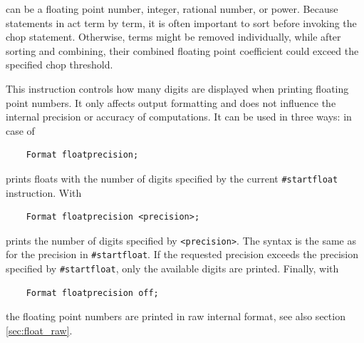 \begin{description}
can be a floating point number, integer, rational number, or power. Because 
statements in \FORM{} act term by term, it is often important to sort before invoking the 
chop statement. Otherwise, terms might be removed individually, while after 
sorting and combining, their combined floating point coefficient could exceed 
the specified chop threshold. 
\item[Format floatprecision] This instruction controls how many digits are 
displayed when printing floating point numbers. It only affects output 
formatting and does not influence the internal precision or accuracy of 
computations. It can be used in three ways: in case of 
\begin{verbatim}
    Format floatprecision;
\end{verbatim}
\FORM{} prints floats with the number of digits specified by the current 
\texttt{\#startfloat} instruction. With
\begin{verbatim}
    Format floatprecision <precision>;
\end{verbatim}
\FORM{} prints the number of digits specified by \texttt{<precision>}. 
The syntax is the same as for the precision in \texttt{\#startfloat}. 
If the requested precision exceeds the precision specified by 
\texttt{\#startfloat}, only the available digits are printed. Finally, with 
\begin{verbatim}
    Format floatprecision off;
\end{verbatim}
the floating point numbers are printed in raw internal format, see also section \ref{sec:float_raw}. 
\end{description}

